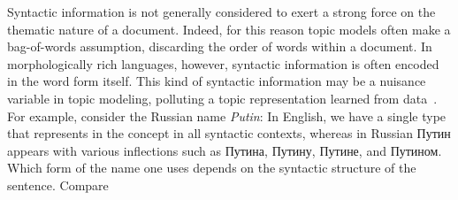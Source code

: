 \documentclass[11pt,letterpaper]{article}
\begin{document}
Syntactic information is not generally considered to exert a strong
force on the thematic nature of a document.  Indeed, for this reason
topic models often make a bag-of-words assumption, discarding the order
of words within a document.  In morphologically rich languages,
however, syntactic information is often encoded in the word form
itself.  This kind of syntactic information may be a nuisance variable
in topic modeling, polluting a topic representation
learned from data~\cite{boydgraber2014}.
For example, consider the Russian name
{\em Putin}: In English, we have a single type that represents in the
concept in all syntactic contexts, whereas in Russian
{ Путин} appears with various inflections
such as {Путина},
{Путину}, {Путине},
and {Путином}. Which form of the name one uses
depends on the syntactic structure of the sentence. Compare
\end{document}
